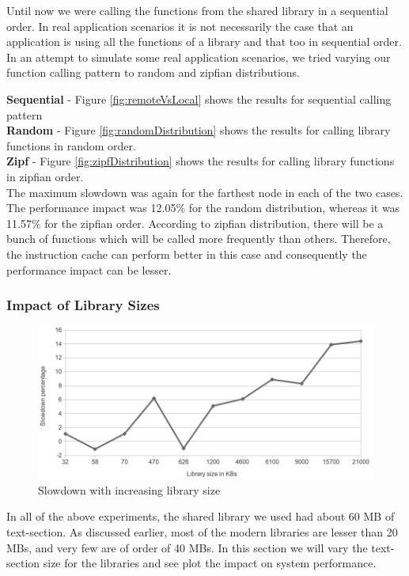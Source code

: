 Until now we were calling the functions from the shared library in a sequential order.
In real application scenarios it is not necessarily the case that an application is using all the functions 
of a library and that too in sequential order. In an attempt to simulate some real application scenarios,
we tried varying our function calling pattern to random and zipfian distributions.

\textbf{Sequential} - Figure \ref{fig:remoteVsLocal} shows the results for sequential calling pattern\\
\textbf{Random} - Figure \ref{fig:randomDistribution} shows the results for calling library functions in random order.\\
\textbf{Zipf} - Figure \ref{fig:zipfDistribution} shows the results for calling library functions in zipfian order.\\

The maximum slowdown was again for the farthest node in each of the two cases. The performance impact was 12.05\% for
the random distribution, whereas it was 11.57\% for the zipfian order. According to zipfian distribution,
there will be a bunch of functions which will be called more frequently than others. Therefore, the instruction cache
can perform better in this case and consequently the performance impact can be lesser.

\subsubsection{Impact of Library Sizes}

\begin{figure}
    \centering
    \includegraphics[scale=0.39]{slowdownWithSize.png}
    \caption{Slowdown with increasing library size }
    \label{fig:slowdownWithSize.png}
\end{figure}

In all of the above experiments, the shared library we used had about 60 MB of text-section.
As discussed earlier, most of the modern libraries are lesser than 20 MBs, and very few are of
order of 40 MBs. In this section we will vary the text-section size for the libraries and see plot
the impact on system performance.

